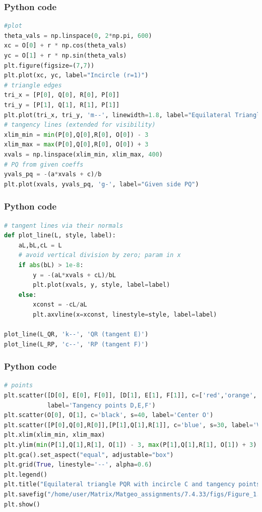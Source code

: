 \documentclass{beamer}
\begin{document}
\begin{frame}[fragile]
    \frametitle{Python code}
    \begin{lstlisting}[language=Python]
#plot
theta_vals = np.linspace(0, 2*np.pi, 600)
xc = O[0] + r * np.cos(theta_vals)
yc = O[1] + r * np.sin(theta_vals)
plt.figure(figsize=(7,7))
plt.plot(xc, yc, label="Incircle (r=1)")
# triangle edges
tri_x = [P[0], Q[0], R[0], P[0]]
tri_y = [P[1], Q[1], R[1], P[1]]
plt.plot(tri_x, tri_y, 'm--', linewidth=1.8, label="Equilateral Triangle")
# tangency lines (extended for visibility)
xlim_min = min(P[0],Q[0],R[0], O[0]) - 3
xlim_max = max(P[0],Q[0],R[0], O[0]) + 3
xvals = np.linspace(xlim_min, xlim_max, 400)
# PQ from given coeffs
yvals_pq = -(a*xvals + c)/b
plt.plot(xvals, yvals_pq, 'g-', label="Given side PQ")

    \end{lstlisting}   
\end{frame}
\begin{frame}[fragile]
    \frametitle{Python code}
    \begin{lstlisting}[language=Python]
# tangent lines via their normals
def plot_line(L, style, label):
    aL,bL,cL = L
    # avoid vertical division by zero; param in x
    if abs(bL) > 1e-8:
        y = -(aL*xvals + cL)/bL
        plt.plot(xvals, y, style, label=label)
    else:
        xconst = -cL/aL
        plt.axvline(x=xconst, linestyle=style, label=label)

plot_line(L_QR, 'k--', 'QR (tangent E)')
plot_line(L_RP, 'c--', 'RP (tangent F)')
    \end{lstlisting}   
\end{frame}

\begin{frame}[fragile]
    \frametitle{Python code}
    \begin{lstlisting}[language=Python]
# points
plt.scatter([D[0], E[0], F[0]], [D[1], E[1], F[1]], c=['red','orange','purple'], zorder=5,
            label='Tangency points D,E,F')
plt.scatter(O[0], O[1], c='black', s=40, label='Center O')
plt.scatter([P[0],Q[0],R[0]],[P[1],Q[1],R[1]], c='blue', s=30, label='Vertices P,Q,R')
plt.xlim(xlim_min, xlim_max)
plt.ylim(min(P[1],Q[1],R[1], O[1]) - 3, max(P[1],Q[1],R[1], O[1]) + 3)
plt.gca().set_aspect("equal", adjustable="box")
plt.grid(True, linestyle='--', alpha=0.6)
plt.legend()
plt.title("Equilateral triangle PQR with incircle C and tangency points D,E,F")
plt.savefig("/home/user/Matrix/Matgeo_assignments/7.4.33/figs/Figure_1.png")
plt.show()

    \end{lstlisting}   
\end{frame}
\end{document}
